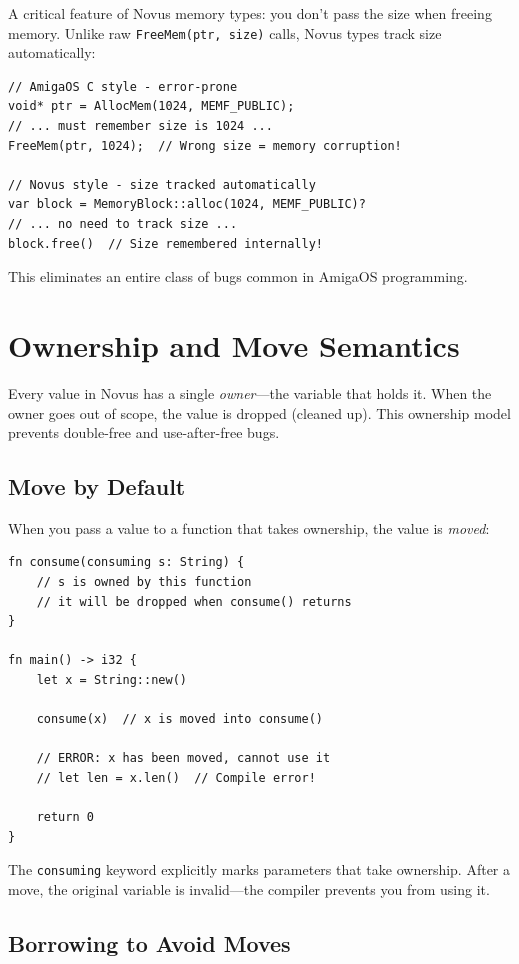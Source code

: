 A critical feature of Novus memory types: you don't pass the size when freeing memory. Unlike raw \texttt{FreeMem(ptr, size)} calls, Novus types track size automatically:

\begin{lstlisting}
// AmigaOS C style - error-prone
void* ptr = AllocMem(1024, MEMF_PUBLIC);
// ... must remember size is 1024 ...
FreeMem(ptr, 1024);  // Wrong size = memory corruption!

// Novus style - size tracked automatically
var block = MemoryBlock::alloc(1024, MEMF_PUBLIC)?
// ... no need to track size ...
block.free()  // Size remembered internally!
\end{lstlisting}

This eliminates an entire class of bugs common in AmigaOS programming.

\section{Ownership and Move Semantics}

Every value in Novus has a single \textit{owner}---the variable that holds it. When the owner goes out of scope, the value is dropped (cleaned up). This ownership model prevents double-free and use-after-free bugs.

\subsection{Move by Default}

When you pass a value to a function that takes ownership, the value is \textit{moved}:

\begin{lstlisting}
fn consume(consuming s: String) {
    // s is owned by this function
    // it will be dropped when consume() returns
}

fn main() -> i32 {
    let x = String::new()

    consume(x)  // x is moved into consume()

    // ERROR: x has been moved, cannot use it
    // let len = x.len()  // Compile error!

    return 0
}
\end{lstlisting}

The \texttt{consuming} keyword explicitly marks parameters that take ownership. After a move, the original variable is invalid---the compiler prevents you from using it.

\subsection{Borrowing to Avoid Moves}

